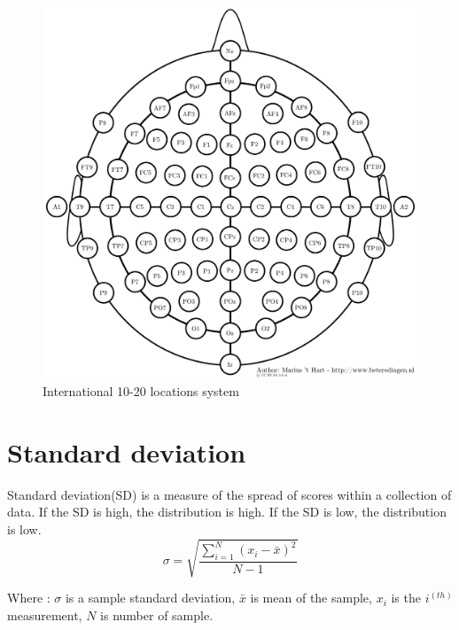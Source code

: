 \begin{figure}[ht]
	\centering
	\includegraphics[scale = 0.5]{chapter3/35.pdf}
	\caption{International 10-20 locations system\cite{ref15}}
\end{figure}

\newpage
\section{Standard deviation}
\hspace{1.5cm} Standard deviation(SD) is a measure of the spread of scores within a collection of data. If the SD is high, the distribution is high. If the SD is low, the distribution is low.
\begin{equation}\label{3}
	 \sigma = \sqrt{\frac{ \sum\limits ^{N}_{i=1} (x_{i} - \bar{x})^2}{N - 1}} 
\end{equation}

Where : $\sigma$ is a sample standard deviation, $\bar{x}$ is mean of the sample,
	   $x_i$ is the $i^(th)$ measurement, $N$ is number of sample.
       
\newpage
